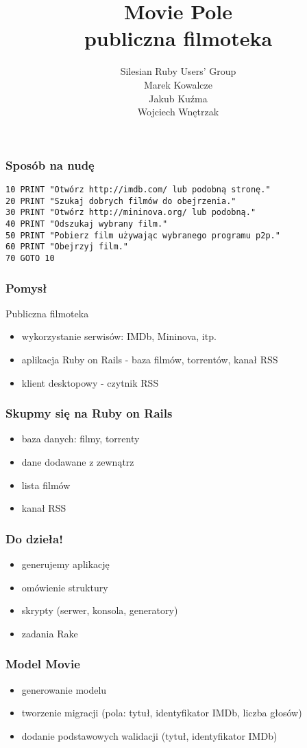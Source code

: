 \documentclass[12t]{beamer}
\author{Silesian Ruby Users' Group \\[10pt]
  \footnotesize{Marek Kowalcze \\
    Jakub Kuźma \\
    Wojciech Wnętrzak}}
\title{Movie Pole \\ publiczna filmoteka}
\begin{document}
\frame{\titlepage}


\begin{frame}[fragile]
  \frametitle{Sposób na nudę}
\begin{verbatim}
10 PRINT "Otwórz http://imdb.com/ lub podobną stronę."
20 PRINT "Szukaj dobrych filmów do obejrzenia."
30 PRINT "Otwórz http://mininova.org/ lub podobną."
40 PRINT "Odszukaj wybrany film."
50 PRINT "Pobierz film używając wybranego programu p2p."
60 PRINT "Obejrzyj film."
70 GOTO 10
\end{verbatim}
\end{frame}

\begin{frame}
  \frametitle{Pomysł}
  Publiczna filmoteka
  \begin{itemize}
  \item wykorzystanie serwisów: IMDb, Mininova, itp.
  \item aplikacja Ruby on Rails - baza filmów, torrentów, kanał RSS
  \item klient desktopowy - czytnik RSS
  \end{itemize}
\end{frame}

\begin{frame}
  \frametitle{Skupmy się na Ruby on Rails}
  \begin{itemize}
  \item baza danych: filmy, torrenty
  \item dane dodawane z zewnątrz
  \item lista filmów
  \item kanał RSS
  \end{itemize}
\end{frame}

\begin{frame}
  \frametitle{Do dzieła!}
  \begin{itemize}
  \item generujemy aplikację
  \item omówienie struktury
  \item skrypty (serwer, konsola, generatory)
  \item zadania Rake
  \end{itemize}
\end{frame}

\begin{frame}
  \frametitle{Model Movie}
  \begin{itemize}
  \item generowanie modelu
  \item tworzenie migracji (pola: tytuł, identyfikator IMDb, liczba
    głosów)
  \item dodanie podstawowych walidacji (tytuł, identyfikator IMDb)
  \end{itemize}
\end{frame}
\end{document}
